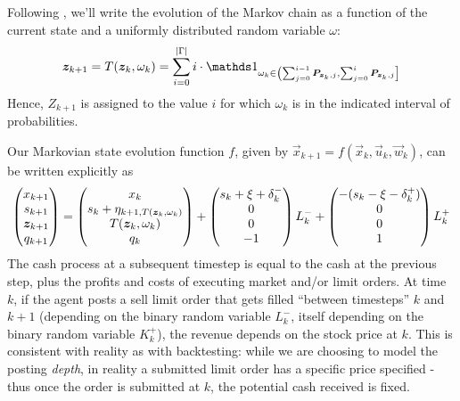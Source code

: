 Following \cite{Kwong15}, we'll write the evolution of the Markov chain as a function of the current state and a uniformly distributed random variable $\omega$:
\begin{equation}
\bz_{k+1} = T(\bz_k, \omega_k) = \sum_{i=0}^{|\Gamma|} i \cdot \indicator_{\omega_k \in \left( \sum_{j=0}^{i-1} \bP_{\bz_k,j} , \sum_{j=0}^{i} \bP_{\bz_k,j} \right]}
\end{equation}
Hence, $Z_{k+1}$ is assigned to the value $i$ for which $\omega_k$ is in the indicated interval of probabilities.

Our Markovian state evolution function $f$, given by $\vec{x}_{k+1} = f \left( \vec{x}_{k},\vec{u}_{k}, \vec{w}_{k} \right)$, can be written explicitly as
\begin{equation}\label{eq:discretestateevolution}
\begin{pmatrix}
x_{k+1} \\
s_{k+1} \\
\bm{z}_{k+1} \\
q_{k+1} 
\end{pmatrix} = \begin{pmatrix}
x_k \\
s_{k} + \eta_{k+1,T(\bm{z}_k, \omega_k)} \\
T(\bm{z}_k, \omega_k) \\
q_{k}
\end{pmatrix}
+ \begin{pmatrix}
s_k + \xi + \delta_k^- \\
0 \\
0 \\
-1
\end{pmatrix}L_k^-
+ \begin{pmatrix}
- (s_k - \xi - \delta_k^+) \\
0 \\
0 \\
1
\end{pmatrix} L_k^+
\end{equation}
The cash process at a subsequent timestep is equal to the cash at the previous step, plus the profits and costs of executing market and/or limit orders. At time $k$, if the agent posts a sell limit order that gets filled ``between timesteps'' $k$ and $k+1$ (depending on the binary random variable $L_k^-$, itself depending on the binary random variable $K_k^+$), the revenue depends on the stock price at $k$. This is consistent with reality as with backtesting: while we are choosing to model the posting \textit{depth}, in reality a submitted limit order has a specific price specified - thus once the order is submitted at $k$, the potential cash received is fixed. 

